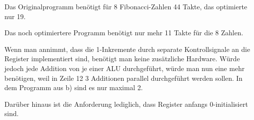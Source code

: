 \documentclass{CInf_practice}
\begin{document}
\cinftitle


Das Originalprogramm benötigt für 8 Fibonacci-Zahlen 44 Takte, das optimierte
nur 19.


Das noch optimiertere Programm benötigt nur mehr 11 Takte für die 8 Zahlen.



Wenn man annimmt, dass die 1-Inkremente durch separate Kontrollsignale an die
Register implementiert sind, benötigt man keine zusätzliche Hardware. Würde
jedoch jede Addition von je einer ALU durchgeführt, würde man nun eine mehr
benötigen,
weil in Zeile 12 3 Additionen parallel durchgeführt werden sollen. In dem
Programm aus b) sind es nur maximal 2.

Darüber hinaus ist die Anforderung lediglich, dass Register anfangs 0-initialisiert
sind.
\end{document}

